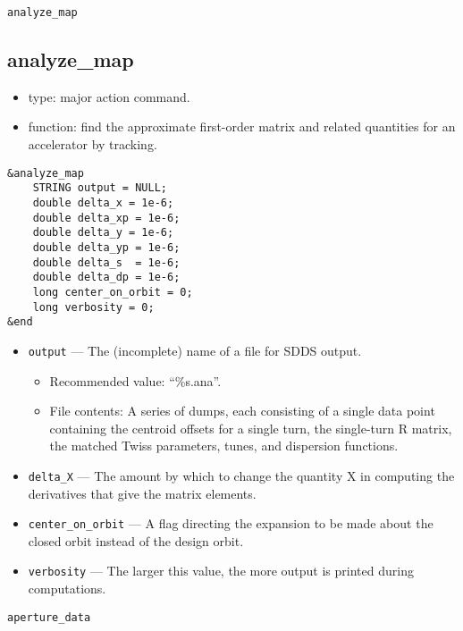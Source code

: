 \documentclass[11pt]{article}
\begin{document}
\begin{latexonly}
\newpage
\begin{center}{\Large\verb|analyze_map|}\end{center}
\end{latexonly}
\subsection{analyze\_map \label{subsec:analyzemap}}

\begin{itemize}
\item type: major action command.
\item function: find the approximate first-order matrix and related quantities for an accelerator by tracking.
\end{itemize}

\begin{verbatim}
&analyze_map
    STRING output = NULL;
    double delta_x = 1e-6;
    double delta_xp = 1e-6;
    double delta_y = 1e-6;
    double delta_yp = 1e-6;
    double delta_s  = 1e-6;
    double delta_dp = 1e-6;
    long center_on_orbit = 0;
    long verbosity = 0;
&end
\end{verbatim}

\begin{itemize}
\item \verb|output| --- The (incomplete) name of a file for SDDS output.
    \begin{itemize}
    \item Recommended value: ``\%s.ana''.
    \item File contents:  A series of dumps, each consisting of a single data point containing
        the centroid offsets for a single turn, the single-turn R matrix, the matched Twiss parameters, tunes, and 
        dispersion functions.
    \end{itemize}
\item \verb|delta_X| --- The amount by which to change the quantity X in computing the derivatives that give the matrix elements.
\item \verb|center_on_orbit| --- A flag directing the expansion to be made about the closed orbit instead of the design orbit.
\item \verb|verbosity| --- The larger this value, the more output is printed during computations.
\end{itemize}

\begin{latexonly}
\newpage
\begin{center}{\Large\verb|aperture_data|}\end{center}
\end{latexonly}
\end{document}
